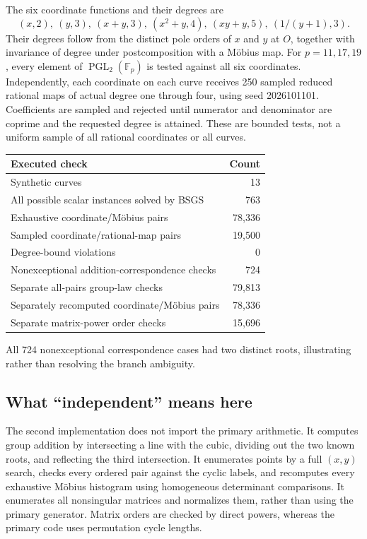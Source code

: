 \documentclass[11pt,letterpaper]{article}
\theoremstyle{definition}
\theoremstyle{remark}
\newcommand{\F}{\mathbb F}
\newcommand{\PGL}{\operatorname{PGL}}
\begin{document}
The six coordinate functions and their degrees are
\[
(x,2),\ (y,3),\ (x+y,3),\ (x^2+y,4),\ (xy+y,5),\ (1/(y+1),3).
\]
Their degrees follow from the distinct pole orders of $x$ and $y$ at $O$, together with invariance of degree under postcomposition with a M\"obius map. For $p=11,17,19$, every element of $\PGL_2(\F_p)$ is tested against all six coordinates. Independently, each coordinate on each curve receives 250 sampled reduced rational maps of actual degree one through four, using seed 2026101101. Coefficients are sampled and rejected until numerator and denominator are coprime and the requested degree is attained. These are bounded tests, not a uniform sample of all rational coordinates or all curves.

\begin{center}
\begin{tabular}{lr}
\toprule
Executed check & Count\\
\midrule
Synthetic curves & 13\\
All possible scalar instances solved by BSGS & 763\\
Exhaustive coordinate/M\"obius pairs & 78,336\\
Sampled coordinate/rational-map pairs & 19,500\\
Degree-bound violations & 0\\
Nonexceptional addition-correspondence checks & 724\\
Separate all-pairs group-law checks & 79,813\\
Separately recomputed coordinate/M\"obius pairs & 78,336\\
Separate matrix-power order checks & 15,696\\
\bottomrule
\end{tabular}
\end{center}
All 724 nonexceptional correspondence cases had two distinct roots, illustrating rather than resolving the branch ambiguity.

\subsection{What ``independent'' means here}

The second implementation does not import the primary arithmetic. It computes group addition by intersecting a line with the cubic, dividing out the two known roots, and reflecting the third intersection. It enumerates points by a full $(x,y)$ search, checks every ordered pair against the cyclic labels, and recomputes every exhaustive M\"obius histogram using homogeneous determinant comparisons. It enumerates all nonsingular matrices and normalizes them, rather than using the primary generator. Matrix orders are checked by direct powers, whereas the primary code uses permutation cycle lengths.
\end{document}
